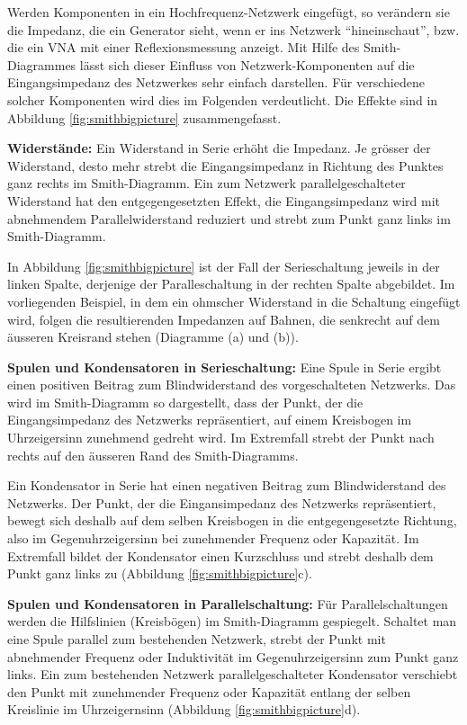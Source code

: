 \documentclass[twoside,a4paper,11pt,halfparskip,DIV=11,notitlepage]{scrartcl}
\begin{document}
Werden Komponenten in ein Hochfrequenz-Netzwerk eingefügt, so verändern sie die Impedanz, die ein Generator sieht,
wenn er ins Netzwerk ``hineinschaut'', bzw. die ein VNA mit einer Reflexionsmessung anzeigt. Mit Hilfe des
Smith-Diagrammes lässt sich dieser Einfluss von Netzwerk-Komponenten auf die Eingangsimpedanz des Netzwerkes
sehr einfach darstellen. Für verschiedene solcher Komponenten wird dies im Folgenden verdeutlicht. Die
Effekte sind in Abbildung \ref{fig:smithbigpicture} zusammengefasst.

\newpage %

\textbf{Widerstände:} Ein Widerstand in Serie erhöht die Impedanz. 
Je grösser der Widerstand, desto mehr strebt die Eingangsimpedanz in Richtung des
Punktes ganz rechts im Smith-Diagramm. Ein zum Netzwerk parallelgeschalteter Widerstand hat den
entgegengesetzten Effekt, die Eingangsimpedanz wird mit abnehmendem
Parallelwiderstand reduziert und strebt zum Punkt ganz links im Smith-Diagramm.

In Abbildung \ref{fig:smithbigpicture} ist der Fall der Serieschaltung jeweils in der linken Spalte,
derjenige der Paralleschaltung in der rechten Spalte abgebildet. Im vorliegenden Beispiel, in dem ein ohmscher 
Widerstand in die Schaltung eingefügt wird, folgen die resultierenden Impedanzen auf Bahnen, die senkrecht auf dem äusseren 
Kreisrand stehen (Diagramme (a) und (b)). 


\textbf{Spulen und Kondensatoren in Serieschaltung:} Eine Spule in Serie ergibt
einen positiven Beitrag zum Blindwiderstand des vorgeschalteten Netzwerks. Das
wird im Smith-Diagramm so dargestellt, dass der Punkt, der die Eingangsimpedanz
des Netzwerks repräsentiert, auf einem Kreisbogen im Uhrzeigersinn zunehmend
gedreht wird. Im Extremfall strebt der Punkt nach rechts auf den äusseren Rand
des Smith-Diagramms.

Ein Kondensator in Serie hat einen negativen Beitrag zum Blindwiderstand des Netzwerks.
Der Punkt, der die Eingansimpedanz des Netzwerks repräsentiert, bewegt sich deshalb
auf dem selben Kreisbogen in die entgegengesetzte Richtung, also im Gegenuhrzeigersinn
bei zunehmender Frequenz oder Kapazität. Im Extremfall bildet der Kondensator einen
Kurzschluss und strebt deshalb dem Punkt ganz links zu (Abbildung \ref{fig:smithbigpicture}c).

\textbf{Spulen und Kondensatoren in Parallelschaltung:} Für Parallelschaltungen
werden die Hilfslinien (Kreisbögen) im Smith-Diagramm gespiegelt. Schaltet man
eine Spule parallel zum bestehenden Netzwerk, strebt der Punkt mit abnehmender
Frequenz oder Induktivität im Gegenuhrzeigersinn zum Punkt ganz links. Ein zum
bestehenden Netzwerk parallelgeschalteter Kondensator verschiebt den Punkt mit
zunehmender Frequenz oder Kapazität entlang der selben Kreislinie im
Uhrzeigernsinn (Abbildung \ref{fig:smithbigpicture}d).
\end{document}
